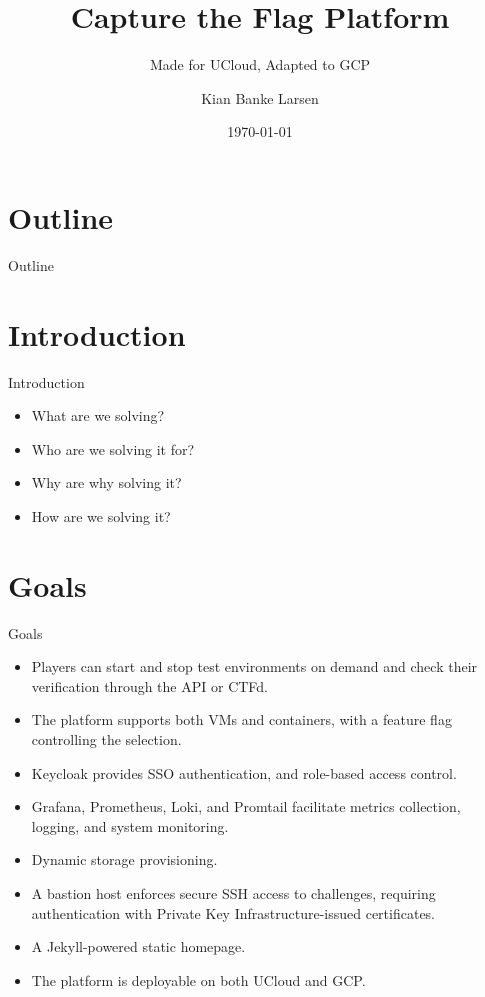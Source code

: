 \documentclass{beamer}
\title{Capture the Flag Platform}
\subtitle{Made for UCloud, Adapted to GCP\\ \vspace{17pt} \vspace{-10pt}}
\author[K. B. Larsen]{Kian Banke Larsen}
\institute{Southern University of Denmark}
\date{\today}
\begin{document}
\begin{frame}
\titlepage
\end{frame}

\section*{Outline}
\begin{frame}{Outline}
\tableofcontents
\end{frame}

\section{Introduction}
\begin{frame}{Introduction}
    \begin{itemize}
        \item What are we solving?
        \item Who are we solving it for?
        \item Why are why solving it?
        \item How are we solving it?
    \end{itemize}
\vspace*{\fill}
\end{frame}

\section{Goals}
\begin{frame}{Goals}
    \begin{itemize}
        \item Players can start and stop test environments on demand and check their verification through the API or CTFd.
        \item The platform supports both VMs and containers, with a feature flag controlling the selection.
        \item Keycloak provides SSO authentication, and role-based access control.
        \item Grafana, Prometheus, Loki, and Promtail facilitate metrics collection, logging, and system monitoring.
        \item Dynamic storage provisioning.
        \item A bastion host enforces secure SSH access to challenges, requiring authentication with Private Key Infrastructure-issued certificates.
        \item A Jekyll-powered static homepage.
        \item The platform is deployable on both UCloud and GCP.
    \end{itemize}
\end{frame}
\end{document}
